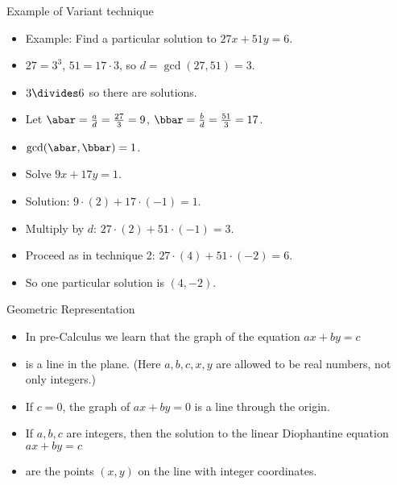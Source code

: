 \documentclass[handout]{beamer}
\begin{document}
\begin{frame}{Example of Variant technique}
\begin{itemize}
  \item Example: Find a particular solution to $27x + 51y = 6$.
  \item $27=3^3$, $51 =17 \cdot 3$, so $d = \gcd(27, 51) = 3$.
  \item $3\divides 6$ so there are solutions.
  \item Let $\abar=\frac{a}{d} = \frac{27}{3} = 9$, $\bbar=\frac{b}{d} = \frac{51}{3} = 17$.
  \item $\gcd(\abar,\bbar)=1$. \item Solve $9x + 17y = 1$.
  \item Solution: $9 \cdot (2) + 17 \cdot (-1) = 1$.
  \item Multiply by $d$: $27\cdot (2) + 51 \cdot (-1) = 3$.
  \item Proceed as in technique 2: $27\cdot (4) + 51 \cdot (-2) = 6$.
  \item So one particular solution is $(4,-2)$.
\end{itemize}

\end{frame}




\begin{frame}{Geometric Representation}

\begin{itemize}
  \item In pre-Calculus we learn that the graph of the equation $ax+by = c$
  \item is a line in the plane. (Here $a,b,c,x,y$ are allowed to be real numbers, not only integers.)
  \item If $c=0$, the graph of $ax+by=0$ is a line through the origin.
  \item If $a,b,c$ are integers, then the solution to the linear Diophantine equation $ax+by=c$
  \item are the points $(x,y)$ on the line with integer coordinates.
\end{itemize}

\end{frame}
\end{document}
